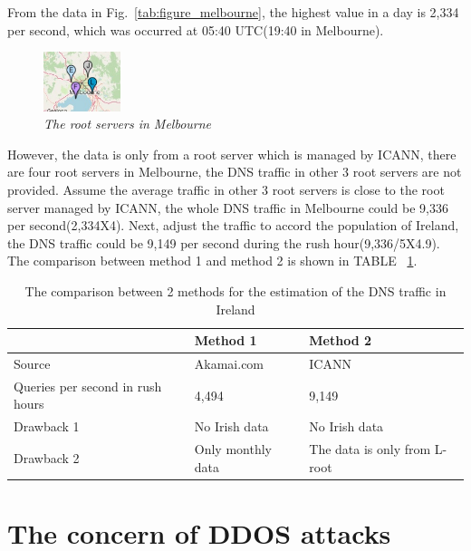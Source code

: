 \documentclass[conference]{IEEEtran}
\begin{document}
From the data in Fig.~\ref{tab:figure_melbourne}, the highest value in a day is 2,334 per second, which was occurred at 05:40 UTC(19:40 in Melbourne).
\\

\begin{figure}[hbt!]  
    \centering
    \includegraphics[width=0.20\textwidth]{figure/root-server-map-melbourne.jpg}
    \caption{\em The root servers in Melbourne \cite{root_servers_org} \label{fig:root_servers_Melbourne}}
\end{figure}

However, the data is only from a root server which is managed by ICANN, there are four root servers in Melbourne, the DNS traffic in other 3 root servers are not provided. Assume the average traffic in other 3 root servers is close to the root server managed by ICANN, the whole DNS traffic in Melbourne could be 9,336 per second(2,334X4). Next, adjust the traffic to accord the population of Ireland, the DNS traffic could be 9,149 per second during the rush hour(9,336/5X4.9).
\\

The comparison between method 1 and method 2 is shown in TABLE ~\ref{tab:estimation_comparison}.
\\


\begin{table}[hbt!]
    \centering
    \begin{tabular}{|p{2cm}|p{2.5cm}|p{2.5cm}|}
        \hline
          & Method 1 & Method 2\\    
        \hline
        Source & Akamai.com & ICANN \\
        \hline
         Queries per second in rush hours & 4,494 & 9,149\\
        \hline
         Drawback 1 & No Irish data & No Irish data \\
        \hline
         Drawback 2 & Only monthly data & The data is only from L-root\\
        \hline
    \end{tabular}
    \caption{The comparison between 2 methods for the estimation of the DNS traffic in Ireland}
    \label{tab:estimation_comparison}
\end{table}

\section{The concern of DDOS attacks}
\end{document}
